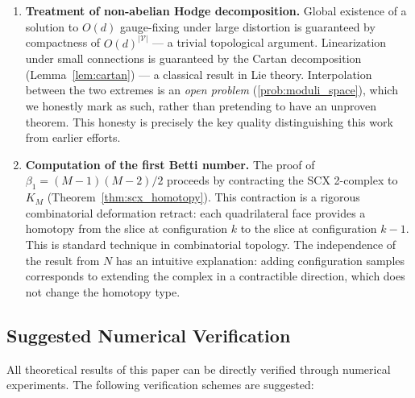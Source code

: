 \documentclass[12pt,a4paper]{article}
\theoremstyle{definition}
\theoremstyle{remark}
\theoremstyle{definition}
\newcommand{\Od}{O(d)}
\newcommand{\verts}{\mathcal{V}}
\newcommand{\ZBetti}{\beta_1}
\begin{document}
\begin{enumerate}[label=(\arabic*)]
    \item \textbf{Treatment of non-abelian Hodge decomposition.}
    Global existence of a solution to $O(d)$ gauge-fixing under large distortion is guaranteed by compactness of $\Od^{|\verts|}$ — a trivial topological argument.
    Linearization under small connections is guaranteed by the Cartan decomposition (Lemma~\ref{lem:cartan}) — a classical result in Lie theory.
    Interpolation between the two extremes is an \textit{open problem} (\ref{prob:moduli_space}), which we honestly mark as such,
    rather than pretending to have an unproven theorem. This honesty is precisely the key quality distinguishing this work from earlier efforts.

    \item \textbf{Computation of the first Betti number.}
    The proof of $\ZBetti = (M-1)(M-2)/2$ proceeds by contracting the SCX 2-complex to $K_M$ (Theorem~\ref{thm:scx_homotopy}).
    This contraction is a rigorous combinatorial deformation retract: each quadrilateral face provides a homotopy from the slice at configuration $k$ to the slice at configuration $k-1$.
    This is standard technique in combinatorial topology. The independence of the result from $N$ has an intuitive explanation:
    adding configuration samples corresponds to extending the complex in a contractible direction, which does not change the homotopy type.
\end{enumerate}

\subsection{Suggested Numerical Verification}

All theoretical results of this paper can be directly verified through numerical experiments. The following verification schemes are suggested:
\end{document}
